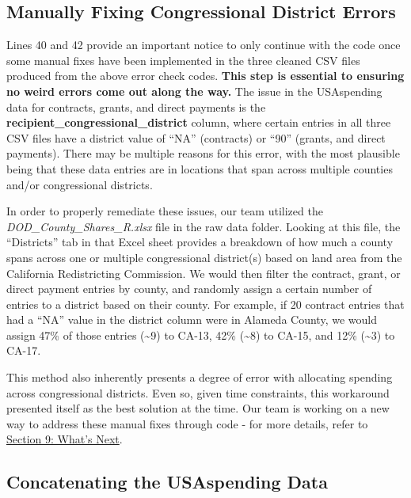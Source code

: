 \documentclass[
]{book}
\begin{document}
\hypertarget{manually-fixing-congressional-district-errors}{%
\subsection{Manually Fixing Congressional District Errors}\label{manually-fixing-congressional-district-errors}}

Lines 40 and 42 provide an important notice to only continue with the code once some manual fixes have been implemented in the three cleaned CSV files produced from the above error check codes. \textbf{This step is essential to ensuring no weird errors come out along the way.} The issue in the USAspending data for contracts, grants, and direct payments is the \textbf{recipient\_congressional\_district} column, where certain entries in all three CSV files have a district value of ``NA'' (contracts) or ``90'' (grants, and direct payments). There may be multiple reasons for this error, with the most plausible being that these data entries are in locations that span across multiple counties and/or congressional districts.

In order to properly remediate these issues, our team utilized the \emph{DOD\_County\_Shares\_R.xlsx} file in the raw data folder. Looking at this file, the ``Districts'' tab in that Excel sheet provides a breakdown of how much a county spans across one or multiple congressional district(s) based on land area from the California Redistricting Commission. We would then filter the contract, grant, or direct payment entries by county, and randomly assign a certain number of entries to a district based on their county. For example, if 20 contract entries that had a ``NA'' value in the district column were in Alameda County, we would assign 47\% of those entries (\textasciitilde9) to CA-13, 42\% (\textasciitilde8) to CA-15, and 12\% (\textasciitilde3) to CA-17.

This method also inherently presents a degree of error with allocating spending across congressional districts. Even so, given time constraints, this workaround presented itself as the best solution at the time. Our team is working on a new way to address these manual fixes through code - for more details, refer to \href{LINK\%20TO\%20SECTION\%209\%20OF\%20PROCESS\%20GUIDE}{Section 9: What's Next}.

\hypertarget{concatenating-the-usaspending-data}{%
\subsection{Concatenating the USAspending Data}\label{concatenating-the-usaspending-data}}
\end{document}
